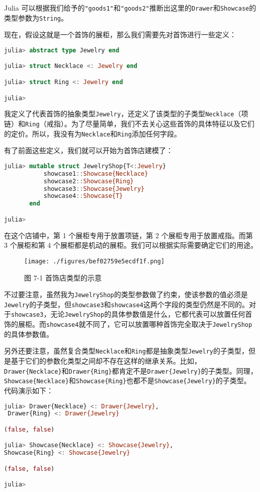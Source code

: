 Julia 可以根据我们给予的\verb|"goods1"|和\verb|"goods2"|推断出这里的\verb|Drawer|和\verb|Showcase|的类型参数为\verb|String|。

现在，假设这就是一个首饰的展柜，那么我们需要先对首饰进行一些定义：
\begin{lstlisting}[language=julia]
julia> abstract type Jewelry end

julia> struct Necklace <: Jewelry end

julia> struct Ring <: Jewelry end

julia> 
\end{lstlisting}

我定义了代表首饰的抽象类型\verb|Jewelry|，还定义了该类型的子类型\verb|Necklace|（项链）和\verb|Ring|（戒指）。为了尽量简单，我们不去关心这些首饰的具体特征以及它们的定价。所以，我没有为\verb|Necklace|和\verb|Ring|添加任何字段。

有了前面这些定义，我们就可以开始为首饰店建模了：
\begin{lstlisting}[language=julia]
julia> mutable struct JewelryShop{T<:Jewelry}
           showcase1::Showcase{Necklace}
           showcase2::Showcase{Ring}
           showcase3::Showcase{Jewelry}
           showcase4::Showcase{T}
       end

julia> 
\end{lstlisting}

在这个店铺中，第 1 个展柜专用于放置项链，第 2 个展柜专用于放置戒指。而第 3 个展柜和第 4 个展柜都是机动的展柜。我们可以根据实际需要确定它们的用途。
\begin{figure}[ht]
\centering
\texttt{[image: ./figures/bef02759e5ecdf1f.png]}
\caption{图 7-1 首饰店类型的示意} \label{fig_JuC7S1_1}
\end{figure}

不过要注意，虽然我为\verb|JewelryShop|的类型参数做了约束，使该参数的值必须是\verb|Jewelry|的子类型，但\verb|showcase3|和\verb|showcase4|这两个字段的类型仍然是不同的。对于\verb|showcase3|，无论\verb|JewelryShop|的具体参数值是什么，它都代表可以放置任何首饰的展柜。而\verb|showcase4|就不同了，它可以放置哪种首饰完全取决于\verb|JewelryShop|的具体参数值。

另外还要注意，虽然复合类型\verb|Necklace|和\verb|Ring|都是抽象类型\verb|Jewelry|的子类型，但是基于它们的参数化类型之间却不存在这样的继承关系。比如，\verb|Drawer{Necklace}|和\verb|Drawer{Ring}|都肯定不是\verb|Drawer{Jewelry}|的子类型。同理，\verb|Showcase{Necklace}|和\verb|Showcase{Ring}|也都不是\verb|Showcase{Jewelry}|的子类型。代码演示如下：
\begin{lstlisting}[language=julia]
julia> Drawer{Necklace} <: Drawer{Jewelry},
 Drawer{Ring} <: Drawer{Jewelry}

(false, false)

julia> Showcase{Necklace} <: Showcase{Jewelry}, 
Showcase{Ring} <: Showcase{Jewelry}

(false, false)

julia> 
\end{lstlisting}

